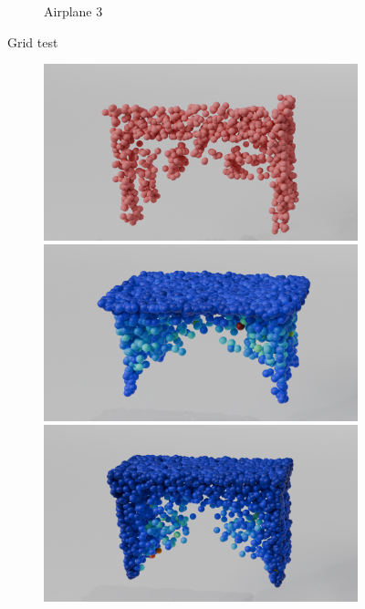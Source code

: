 \begin{figure}[htb]
\begin{subfigure}[t]{0.315\textwidth}
        \caption{Airplane 3}
    \end{subfigure}
    \caption{Grid test}
    \label{fig:airplane}
\end{figure}

\begin{figure}[htb]
      \centering
      \begin{subfigure}[t]{\textwidth+20pt\relax}
        \includegraphics[width=\dimexpr\linewidth-20pt\relax]{figures/part_t1.png}
        \includegraphics[width=\dimexpr\linewidth-20pt\relax]{figures/dc_lin_t1.png}
        \includegraphics[width=\dimexpr\linewidth-20pt\relax]{figures/do_lin_t1.png}

\end{subfigure}
\end{figure}
